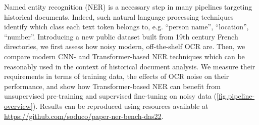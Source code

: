 Named entity recognition (NER) is a necessary step in many pipelines targeting historical documents.
Indeed, such natural language processing techniques identify which class each text token belongs to,
e.g. ``person name'', ``location'', ``number''.
Introducing a new public dataset built from 19th century French directories,
we first assess how noisy modern, off-the-shelf OCR are.
Then, we compare modern CNN- and Transformer-based NER techniques
which can be reasonably used in the context of historical document analysis.
We measure their requirements in terms of training data,
the effects of OCR noise on their performance,
and show how Transformer-based NER can benefit from unsupervised pre-training 
and supervised fine-tuning on noisy data (\cref{fig.pipeline-overview}).
Results can be reproduced using resources available at \url{https://github.com/soduco/paper-ner-bench-das22}.
